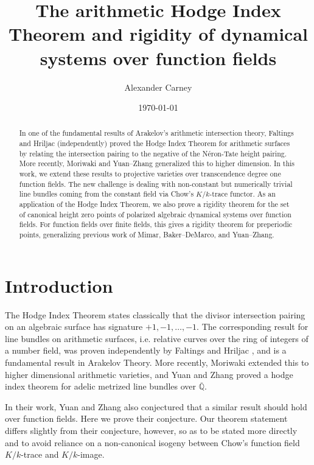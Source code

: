 \documentclass[times, doublespace]{amsart}
\numberwithin{equation}{section}
\theoremstyle{plain}
\theoremstyle{definition}
\newcommand{\Q}{\mathbb{Q}}
\begin{document}
\title{The arithmetic Hodge Index Theorem and rigidity of dynamical systems over function fields}


\author{Alexander Carney}

\date{\today}


\begin{abstract}
In one of the fundamental results of Arakelov's arithmetic intersection theory, Faltings and Hriljac (independently) proved the Hodge Index Theorem for arithmetic surfaces by relating the intersection pairing to the negative of the N\'eron-Tate height pairing. More recently, Moriwaki and Yuan--Zhang generalized this to higher dimension. In this work, we extend these results to projective varieties over transcendence degree one function fields. The new challenge is dealing with non-constant but numerically trivial line bundles coming from the constant field via Chow's $K/k$-trace functor. As an application of the Hodge Index Theorem, we also prove a rigidity theorem for the set of canonical height zero points of polarized algebraic dynamical systems over function fields. For function fields over finite fields, this gives a rigidity theorem for preperiodic points, generalizing previous work of Mimar, Baker--DeMarco, and Yuan--Zhang.
\end{abstract}

\maketitle



\section{Introduction}\label{intro}
The Hodge Index Theorem states classically that the divisor intersection pairing on an algebraic surface has signature $+1,-1,\dots,-1$. The corresponding result for line bundles on arithmetic surfaces, i.e. relative curves over the ring of integers of a number field, was proven independently by Faltings \cite{faltings} and Hriljac \cite{hriljac}, and is a fundamental result in Arakelov Theory. More recently, Moriwaki \cite{Moriwaki} extended this to higher dimensional arithmetic varieties, and Yuan and Zhang \cite{yz} proved a hodge index theorem for adelic metrized line bundles over $\overline{\Q}$.

In their work, Yuan and Zhang also conjectured that a similar result should hold over function fields. Here we prove their conjecture. Our theorem statement differs slightly from their conjecture, however, so as to be stated more directly and to avoid reliance on a non-canonical isogeny between Chow's function field $K/k$-trace and $K/k$-image. 
\end{document}
